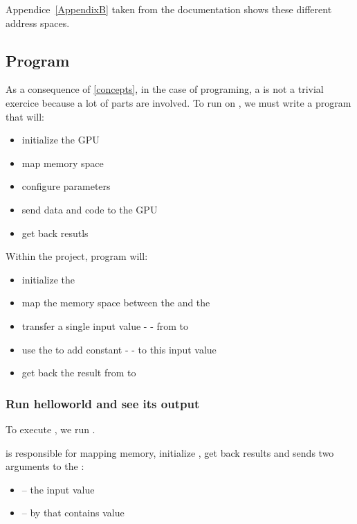 Appendice~\ref{AppendixB} taken from the \bcm{} documentation \parencite{refBCM} shows these different address spaces.



\subsection{ Program}

As a consequence of \ref{concepts}, in the case of  programing, a  is not a trivial exercice because a lot of parts are involved. To run  on \vc, we must write a \cpu{} program  that will:
\begin{itemize}
	\item initialize the GPU
	\item map \ram{} memory space
	\item configure parameters
	\item send data and code to the GPU
	\item get back resutls
\end{itemize}
\vspace{5 mm}

Within the  project,  program will:

\begin{itemize}
	\item initialize the \vc
	\item map the \ram{} memory space between the \vc{} and the \cpu
	\item transfer a single input value -  - from \cpu{} to \vc
	\item use the \vc{} to add constant  -  - to this input value
	\item get back the result from \vc{} to \cpu
\end{itemize}

\newpage
\subsubsection{Run helloworld and see its output}

To execute , we run .

 is responsible for mapping memory, initialize , get back results and sends two arguments to the :
\begin{itemize}
	\item {} -- the input value
	\item {} --  by \vc{} that contains  value
\end{itemize}

